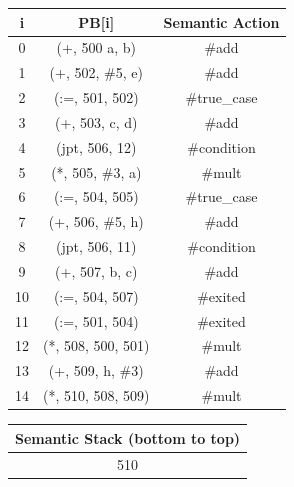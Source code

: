 \documentclass[]{article}
\begin{document}
\begin{latin}
\centering
\begin{tabular}{|c|c|c|}
    \hline
    i & PB[i] & Semantic Action\\
    \hline
    0 & (+, 500 a, b) & \#add\\
    1 & (+, 502, \#5, e) & \#add\\
    2 & (:=, 501, 502) & \#true\_case\\
    3 & (+, 503, c, d) & \#add\\
    4 & (jpt, 506, 12) & \#condition\\
    5 & (*, 505, \#3, a) & \#mult\\
    6 & (:=, 504, 505) & \#true\_case\\
    7 & (+, 506, \#5, h) & \#add\\
    8 & (jpt, 506, 11) & \#condition\\
    9 & (+, 507, b, c) & \#add\\
    10 & (:=, 504, 507) & \#exited\\
    11 & (:=, 501, 504) & \#exited\\
    12 & (*, 508, 500, 501) & \#mult\\
    13 & (+, 509, h, \#3) & \#add\\
    14 & (*, 510, 508, 509) & \#mult\\
    \hline
\end{tabular}
\begin{tabular}{|c|}
    \hline
    Semantic Stack (bottom to top)\\
    \hline
    510\\
    \hline
\end{tabular}
\end{latin}
\end{document}
